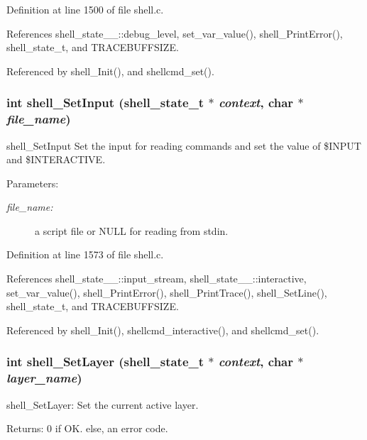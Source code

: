 Definition at line 1500 of file shell.c.

References shell\_\-state\_\-\_\-::debug\_\-level, set\_\-var\_\-value(), shell\_\-Print\-Error(), shell\_\-state\_\-t, and TRACEBUFFSIZE.

Referenced by shell\_\-Init(), and shellcmd\_\-set().
\subsubsection{\setlength{\rightskip}{0pt plus 5cm}int shell\_\-Set\-Input ({\bf shell\_\-state\_\-t} $\ast$ {\em context}, char $\ast$ {\em file\_\-name})}\label{shell_8h_a26}


shell\_\-Set\-Input Set the input for reading commands and set the value of \$INPUT and \$INTERACTIVE.

\begin{Desc}
\item[Parameters:]
\begin{description}
\item[{\em file\_\-name:}]a script file or NULL for reading from stdin. \end{description}
\end{Desc}


Definition at line 1573 of file shell.c.

References shell\_\-state\_\-\_\-::input\_\-stream, shell\_\-state\_\-\_\-::interactive, set\_\-var\_\-value(), shell\_\-Print\-Error(), shell\_\-Print\-Trace(), shell\_\-Set\-Line(), shell\_\-state\_\-t, and TRACEBUFFSIZE.

Referenced by shell\_\-Init(), shellcmd\_\-interactive(), and shellcmd\_\-set().
\subsubsection{\setlength{\rightskip}{0pt plus 5cm}int shell\_\-Set\-Layer ({\bf shell\_\-state\_\-t} $\ast$ {\em context}, char $\ast$ {\em layer\_\-name})}\label{shell_8h_a17}


shell\_\-Set\-Layer: Set the current active layer. \begin{Desc}
\item[Returns:]0 if OK. else, an error code. \end{Desc}


